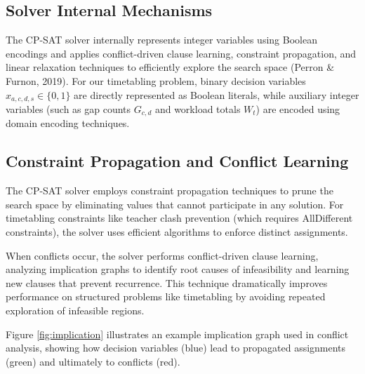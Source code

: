 \documentclass[12pt,a4paper]{article}
\begin{document}
\subsection{Solver Internal Mechanisms}

The CP-SAT solver internally represents integer variables using Boolean encodings and applies conflict-driven clause learning, constraint propagation, and linear relaxation techniques to efficiently explore the search space (Perron \& Furnon, 2019). For our timetabling problem, binary decision variables $x_{a,c,d,s} \in \{0,1\}$ are directly represented as Boolean literals, while auxiliary integer variables (such as gap counts $G_{c,d}$ and workload totals $W_t$) are encoded using domain encoding techniques.

\subsection{Constraint Propagation and Conflict Learning}

The CP-SAT solver employs constraint propagation techniques to prune the search space by eliminating values that cannot participate in any solution. For timetabling constraints like teacher clash prevention (which requires AllDifferent constraints), the solver uses efficient algorithms to enforce distinct assignments.

When conflicts occur, the solver performs conflict-driven clause learning, analyzing implication graphs to identify root causes of infeasibility and learning new clauses that prevent recurrence. This technique dramatically improves performance on structured problems like timetabling by avoiding repeated exploration of infeasible regions.

Figure \ref{fig:implication} illustrates an example implication graph used in conflict analysis, showing how decision variables (blue) lead to propagated assignments (green) and ultimately to conflicts (red).
\end{document}
